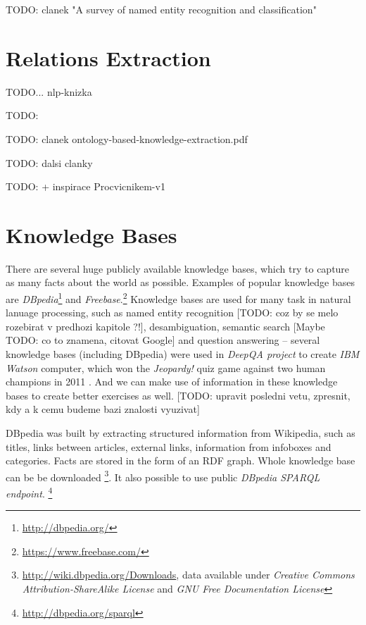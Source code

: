 \documentclass[a4paper, 12pt, twoside]{fithesis2}		%
\renewcommand{\_}{\leavevmode \kern0.07em\vbox{\hrule width0.4em}}
\begin{document}
TODO: clanek "A survey of named entity recognition and classification" \autocite{named-entity-recognition}


\section{Relations Extraction}
\label{sec:relations-extraction}

TODO... nlp-knizka

TODO: \parencite{triples-acquisition}

TODO: clanek ontology-based-knowledge-extraction.pdf

TODO: dalsi clanky

TODO: + inspirace Procvicnikem-v1

\section{Knowledge Bases}
\label{sec:knowledge-bases}

There are several huge publicly available knowledge bases,
which try to capture as many facts about the world as possible.
Examples of popular knowledge bases are
\textit{DBpedia}\footnote{\url{http://dbpedia.org/}}
and \textit{Freebase}.\footnote{\url{https://www.freebase.com/}}
Knowledge bases are used for many task in natural lanuage processing,
such as named entity recognition [TODO: coz by se melo rozebirat v predhozi kapitole ?!],
desambiguation,
semantic search [Maybe TODO: co to znamena, citovat Google]
and question answering -- several knowledge bases (including DBpedia) were used in \emph{DeepQA project} to create \emph{IBM Watson} computer, which won the \emph{Jeopardy!} quiz game against two human champions in 2011 \cite{watson}. And we can make use of information in these knowledge bases to create better exercises as well. [TODO: upravit posledni vetu, zpresnit, kdy a k cemu budeme bazi znalosti vyuzivat]

DBpedia was built by extracting structured information from Wikipedia,
such as titles, links between articles, external links, information from infoboxes and categories.
Facts are stored in the form of an RDF graph.
Whole knowledge base can be be downloaded%
\footnote{\url{http://wiki.dbpedia.org/Downloads}, %
data available under \emph{Creative Commons Attribution-ShareAlike License}
and \emph{GNU Free Documentation License}}.
It also possible to use public \textit{DBpedia SPARQL endpoint}.%
\footnote{\url{http://dbpedia.org/sparql}}
\end{document}
